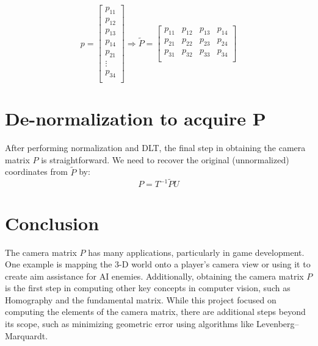 \documentclass[12pt]{article}
\begin{document}
\[
p = 
\begin{bmatrix}
p_{11} \\
p_{12} \\
p_{13} \\
p_{14} \\
p_{21} \\
\vdots \\
p_{34} \\
\end{bmatrix} \Longrightarrow
\tilde{P} = 
\begin{bmatrix}
p_{11} & p_{12} & p_{13} & p_{14} \\
p_{21} & p_{22} & p_{23} & p_{24} \\
p_{31} & p_{32} & p_{33} & p_{34} \\
\end{bmatrix}
\]

\section{De-normalization to acquire P}
After performing normalization and DLT, the final step in obtaining the camera matrix \( P \) is straightforward. We need to recover the original (unnormalized) coordinates from \( \tilde{P} \) by:
\[
P = T^{-1} \tilde{P} U
\]

\section{Conclusion}
The camera matrix \( P \) has many applications, particularly in game development. One example is mapping the 3-D world onto a player's camera view or using it to create aim assistance for AI enemies. Additionally, obtaining the camera matrix \( P \) is the first step in computing other key concepts in computer vision, such as Homography and the fundamental matrix. While this project focused on computing the elements of the camera matrix, there are additional steps beyond its scope, such as minimizing geometric error using algorithms like Levenberg–Marquardt.

\newpage
\end{document}
